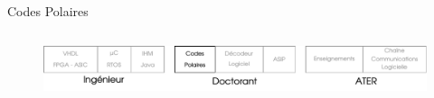 \documentclass[t,compress,mathserif,12pt,xcolor=dvipsnames]{beamer}
\begin{document}
\begin{frame}[t]{Codes Polaires}
\begin{minipage}[t][5.0cm][t]{\textwidth}
\begin{columns}[T]
\begin{column}{0.04\textwidth}
      \end{column}
      \begin{column}{0.33\textwidth}
      \end{column}
    \end{columns}
  \end{minipage}
  \begin{figure}[htp]
    \centering
    \includegraphics[width=\textwidth]{fig/frise20}
  \end{figure}
\end{frame}
\end{document}
